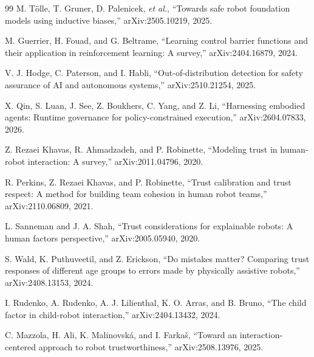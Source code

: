 \documentclass[conference]{IEEEtran}
\begin{document}
\begin{thebibliography}{99}
M. T{\"o}lle, T. Gruner, D. Palenicek, \emph{et al.}, ``Towards safe robot foundation models using inductive biases,'' arXiv:2505.10219, 2025.

M. Guerrier, H. Fouad, and G. Beltrame, ``Learning control barrier functions and their application in reinforcement learning: A survey,'' arXiv:2404.16879, 2024.

V. J. Hodge, C. Paterson, and I. Habli, ``Out-of-distribution detection for safety assurance of AI and autonomous systems,'' arXiv:2510.21254, 2025.

X. Qin, S. Luan, J. See, Z. Boukhers, C. Yang, and Z. Li, ``Harnessing embodied agents: Runtime governance for policy-constrained execution,'' arXiv:2604.07833, 2026.

Z. Rezaei Khavas, R. Ahmadzadeh, and P. Robinette, ``Modeling trust in human-robot interaction: A survey,'' arXiv:2011.04796, 2020.

R. Perkins, Z. Rezaei Khavas, and P. Robinette, ``Trust calibration and trust respect: A method for building team cohesion in human robot teams,'' arXiv:2110.06809, 2021.

L. Sanneman and J. A. Shah, ``Trust considerations for explainable robots: A human factors perspective,'' arXiv:2005.05940, 2020.

S. Wald, K. Puthuveetil, and Z. Erickson, ``Do mistakes matter? Comparing trust responses of different age groups to errors made by physically assistive robots,'' arXiv:2408.13153, 2024.

I. Rudenko, A. Rudenko, A. J. Lilienthal, K. O. Arras, and B. Bruno, ``The child factor in child-robot interaction,'' arXiv:2404.13432, 2024.

C. Mazzola, H. Ali, K. Malinovsk{\'a}, and I. Farka{\v{s}}, ``Toward an interaction-centered approach to robot trustworthiness,'' arXiv:2508.13976, 2025.

\end{thebibliography}
\end{document}
